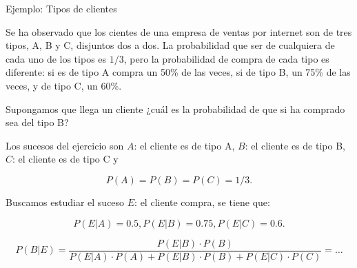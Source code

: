 \documentclass[
  letterpaper,
  DIV=11,
  numbers=noendperiod]{scrreprt}
\begin{document}
\begin{Ejemplo}{Ejemplo: Tipos de clientes}{}

Se ha observado que los cientes de una empresa de ventas por internet
son de tres tipos, A, B y C, disjuntos dos a dos. La probabilidad que
ser de cualquiera de cada uno de los tipos es \(1/3\), pero la
probabilidad de compra de cada tipo es diferente: si es de tipo A compra
un 50\% de las veces, si de tipo B, un 75\% de las veces, y de tipo C,
un 60\%.

Supongamos que llega un cliente ¿cuál es la probabilidad de que si ha
comprado sea del tipo B?

Los sucesos del ejercicio son \(A\): el cliente es de tipo A, \(B\): el
cliente es de tipo B, \(C\): el cliente es de tipo C y

\[P(A)=P(B)=P(C)=1/3.\]

Buscamos estudiar el suceso \(E\): el cliente compra, se tiene que:

\[P(E|A)=0.5, P(E|B)=0.75, P(E|C)=0.6.\]

\[P(B|E)\!=\!\dfrac{P(E|B)\cdot P(B)}{P(E|A)\!\cdot\! P(A)\!+\!P(E|B)\!\cdot\! P(B)\!+\!P(E|C)\!\cdot\! P(C)}\!=\!\ldots\]

\end{Ejemplo}
\end{document}
